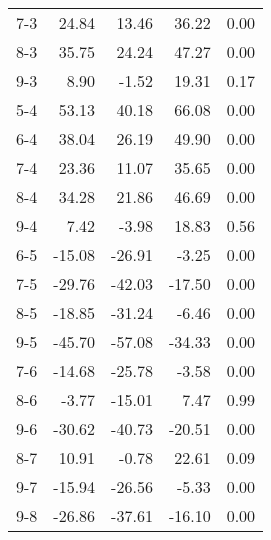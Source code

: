 \documentclass[10pt,a4paper]{article}
\begin{document}
\begin{table}[ht]
\begin{tabular}{rrrrr}
  7-3 & 24.84 & 13.46 & 36.22 & 0.00 \\ 
  8-3 & 35.75 & 24.24 & 47.27 & 0.00 \\ 
  9-3 & 8.90 & -1.52 & 19.31 & 0.17 \\ 
  5-4 & 53.13 & 40.18 & 66.08 & 0.00 \\ 
  6-4 & 38.04 & 26.19 & 49.90 & 0.00 \\ 
  7-4 & 23.36 & 11.07 & 35.65 & 0.00 \\ 
  8-4 & 34.28 & 21.86 & 46.69 & 0.00 \\ 
  9-4 & 7.42 & -3.98 & 18.83 & 0.56 \\ 
  6-5 & -15.08 & -26.91 & -3.25 & 0.00 \\ 
  7-5 & -29.76 & -42.03 & -17.50 & 0.00 \\ 
  8-5 & -18.85 & -31.24 & -6.46 & 0.00 \\ 
  9-5 & -45.70 & -57.08 & -34.33 & 0.00 \\ 
  7-6 & -14.68 & -25.78 & -3.58 & 0.00 \\ 
  8-6 & -3.77 & -15.01 & 7.47 & 0.99 \\ 
  9-6 & -30.62 & -40.73 & -20.51 & 0.00 \\ 
  8-7 & 10.91 & -0.78 & 22.61 & 0.09 \\ 
  9-7 & -15.94 & -26.56 & -5.33 & 0.00 \\ 
  9-8 & -26.86 & -37.61 & -16.10 & 0.00 \\ 
   \hline
\end{tabular}
\end{table}
\end{document}
